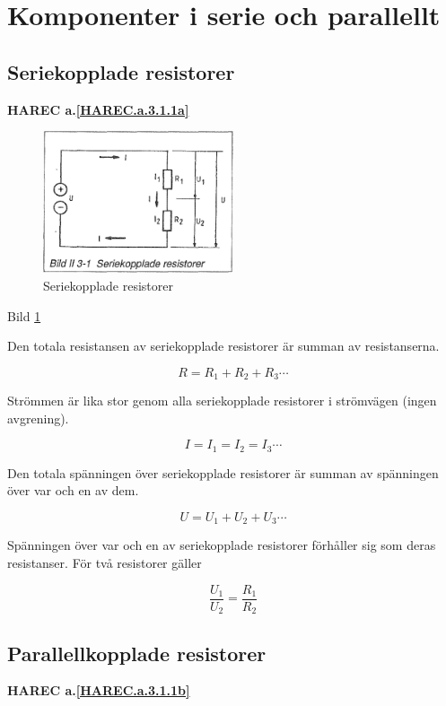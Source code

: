 \section{Komponenter i serie och parallellt}

\subsection{Seriekopplade resistorer}
\textbf{HAREC a.\ref{HAREC.a.3.1.1a}\label{myHAREC.a.3.1.1a}}

\begin{figure}
\includegraphics[width=0.5\textwidth]{images/bild_2_3-01}
\caption{Seriekopplade resistorer}
\label{fig:BildII3-01}
\end{figure}

Bild \ref{fig:BildII3-01}

Den totala resistansen av seriekopplade resistorer är summan av resistanserna.

\[R = R_1 + R_2 + R_3 \cdots \]

Strömmen är lika stor genom alla seriekopplade resistorer i strömvägen (ingen
avgrening).

\[I = I_1 = I_2 = I_3 \cdots \]

Den totala spänningen över seriekopplade resistorer är summan av spänningen över
var och en av dem.

\[U = U_1 + U_2 + U_3 \cdots \]

Spänningen över var och en av seriekopplade resistorer förhåller sig som deras
resistanser. För två resistorer gäller

\[\frac{U_1}{U_2} = \frac{R_1}{R_2}\]


\subsection{Parallellkopplade resistorer}
\textbf{HAREC a.\ref{HAREC.a.3.1.1b}\label{myHAREC.a.3.1.1b}}

